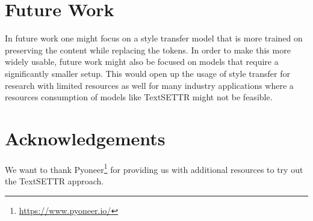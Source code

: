 \documentclass[twocolumn]{tum-article}
\begin{document}
\section{Future Work}
In future work one might focus on a style transfer model that is more trained on preserving the content while replacing the tokens. In order to make this more widely usable, future work might also be focused on models that require a significantly smaller setup. This would open up the usage of style transfer for research with limited resources as well for many industry applications where a resources consumption of models like TextSETTR might not be feasible.
\section*{Acknowledgements}
We want to thank Pyoneer\footnote{\url{https://www.pyoneer.io/}} for providing us with additional resources to try out the TextSETTR approach. 


\end{document}
